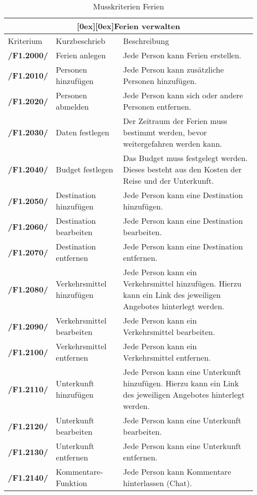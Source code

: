 \documentclass[10pt,a4paper,titlepage,twoside,german]{zhawreprt}
\newcommand{\AddRequirement}[2]{
\textbf{/#1#2/}
}
\newcommand{\F}[1]{
\AddRequirement{F1.}{#1}
}
\newcommand{\tableheader}[2]{\multicolumn{#1}{c}{\raisebox{-0.3em}[0ex][0ex]{\large{\textbf{#2}}}}}
\begin{document}
\begin{table}[ht]\centering
\begin{tabular}{l|p{4.5cm}|p{7.5cm}}\hline
\tableheader{3}{Ferien verwalten}\\[0.3em]\hline
Kriterium & Kurzbeschrieb & Beschreibung\\\hline
\F{2000} & Ferien anlegen & Jede Person kann Ferien erstellen.\\\hline
\F{2010} & Personen hinzufügen & Jede Person kann zusätzliche Personen hinzufügen.\\\hline
\F{2020} & Personen abmelden & Jede Person kann sich oder andere Personen entfernen.\\\hline
\F{2030} & Daten festlegen & Der Zeitraum der Ferien muss bestimmt werden, bevor weitergefahren werden kann.\\\hline
\F{2040} & Budget festlegen & Das Budget muss festgelegt werden. Dieses besteht aus den Kosten der Reise und der Unterkunft.\\\hline
\F{2050} & Destination hinzufügen & Jede Person kann eine Destination hinzufügen.\\\hline
\F{2060} & Destination bearbeiten & Jede Person kann eine Destination bearbeiten.\\\hline
\F{2070} & Destination entfernen & Jede Person kann eine Destination entfernen.\\\hline
\F{2080} & Verkehrsmittel hinzufügen & Jede Person kann ein Verkehrsmittel hinzufügen. Hierzu kann ein Link des jeweiligen Angebotes hinterlegt werden.\\\hline
\F{2090} & Verkehrsmittel bearbeiten & Jede Person kann ein Verkehrsmittel bearbeiten.\\\hline
\F{2100} & Verkehrsmittel entfernen & Jede Person kann ein Verkehrsmittel entfernen.\\\hline
\F{2110} & Unterkunft hinzufügen & Jede Person kann eine Unterkunft hinzufügen. Hierzu kann ein Link des jeweiligen Angebotes hinterlegt werden.\\\hline
\F{2120} & Unterkunft bearbeiten & Jede Person kann eine Unterkunft bearbeiten.\\\hline
\F{2130} & Unterkunft entfernen & Jede Person kann eine Unterkunft entfernen.\\\hline
\F{2140} & Kommentare-Funktion & Jede Person kann Kommentare hinterlassen (Chat).\\\hline
\end{tabular}
\caption{Musskriterien Ferien}\label{tbl:MustVacation}
\end{table}\newpage
\end{document}
